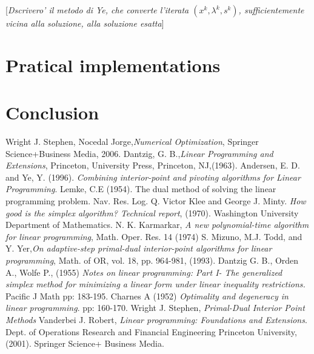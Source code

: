 \documentclass[a4paper,10 pt,titlepage,twoside]{book}
\theoremstyle{plain}
\theoremstyle{definition}
\theoremstyle{remark}
\begin{document}
[\textit{Dscrivero' il metodo di Ye, che converte l'iterata $(x^{k}, \lambda^{k},s^{k})$, sufficientemente vicina alla soluzione, alla soluzione esatta}]


\chapter{Pratical implementations}

\chapter{Conclusion}

\begin{thebibliography}{9}
	
	Wright J. Stephen, Nocedal Jorge,\emph{\;Numerical Optimization}, Springer Science+Business Media, 2006.
	Dantzig, G. B.,\emph{\;Linear Programming and Extensions}, Princeton, University Press, Princeton, NJ,(1963).
	 Andersen, E. D. and Ye, Y. (1996). \textit{Combining interior-point and pivoting algorithms for Linear Programming}.
	 Lemke, C.E (1954). The dual method of solving the linear programming problem. Nav. Res. Log. Q.
	Victor Klee and George J. Minty.\emph{ How good is the simplex algorithm? Technical report}, (1970). Washington University Department of Mathematics.
	 N. K. Karmarkar,\emph{ A new polynomial-time algorithm for linear programming}, Math. Oper. Res. 14 (1974)
	 S. Mizuno, M.J. Todd, and Y. Yer,\emph{\;On adaptive-step primal-dual interior-point algorithms for linear programming}, Math. of OR, vol. 18, pp. 964-981, (1993). 
	 Dantzig G. B., Orden A., Wolfe P., (1955) \emph{ Notes on linear programming: Part I- The generalized simplex method for
	minimizing a linear form under linear inequality restrictions.} Pacific J Math pp: 183-195. 
	  Charnes A (1952)\emph{ Optimality and degeneracy in linear programming}. pp: 160-170. 
	\bibitem {} Wright J. Stephen, \emph{\;Primal-Dual Interior Point Methods}
	 Vanderbei J. Robert, \emph{\;Linear programming:
		Foundations and Extensions}. Dept. of Operations Research and Financial Engineering
	Princeton University, (2001). Springer Science+ Business Media.
	
\end{thebibliography}
\end{document}
